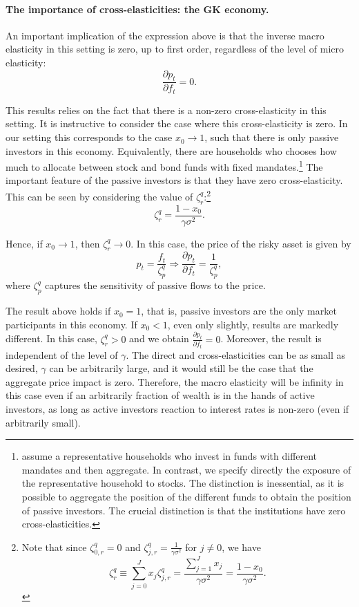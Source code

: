 \documentclass[11pt,english]{article}
\begin{document}
\paragraph{The importance of cross-elasticities: the GK economy.} An important implication of the expression above is that the inverse macro elasticity in this setting is zero, up to first order, regardless of the level of micro elasticity:
\begin{equation}
    \frac{\partial p_t}{\partial f_t} = 0.
\end{equation}

This results relies on the fact that there is a non-zero cross-elasticity in this setting.  
It is instructive to consider the case where this cross-elasticity is zero. 
In our setting this corresponds to the case $x_0 \rightarrow 1$, such that there is only passive investors in this economy. Equivalently, there are households who chooses how much to allocate between stock and bond funds with fixed mandates.\footnote{\citet{gabaix2020search} assume a representative households who invest in funds with different mandates and then aggregate. In contrast, we specify directly the exposure of the representative household to stocks. The distinction is inessential, as it is possible to aggregate the position of the different funds to obtain the position of passive investors. The crucial distinction is that the institutions have zero cross-elasticities. }
The important feature of the passive investors is that they have zero cross-elasticity. 
This can be seen by considering the value of $\zeta_{r}^q$:\footnote{Note that since $\zeta_{0,r}^q=0$ and $\zeta_{j,r}^q=\frac{1}{\gamma\sigma^2}$ for $j\neq0$, we have \[\zeta_{r}^q \equiv \sum_{j=0}^J x_j \zeta_{j,r}^q=\frac{\sum_{j=1}^J x_j}{\gamma\sigma^2}=\frac{1-x_0}{\gamma\sigma^2}.\]}
\begin{equation}
\zeta_r^q = \frac{1-x_0}{\gamma\sigma^2}.
\end{equation}

Hence, if $x_0 \rightarrow 1$, then $\zeta_r^q \rightarrow 0$. In this case, the price of the risky asset is given by
\begin{equation}
    p_t = \frac{f_t}{\zeta_p^q} \Rightarrow \frac{\partial p_t}{\partial f_t} = \frac{1}{\zeta_p^q},
\end{equation}
where $\zeta_{p}^q$ captures the sensitivity of passive flows to the price. 

The result above holds if $x_0 = 1$, that is, passive investors are the only market participants in this economy. If $x_0 < 1$, even only slightly, results are markedly different. In this case, $\zeta_r^q > 0$ and we obtain $\frac{\partial p_t}{\partial f_t} = 0$. Moreover, the result is independent of the level of $\gamma$. 
The direct and cross-elasticities can be as small as desired, $\gamma$ can be arbitrarily large, and it would still be the case that the aggregate price impact is zero. 
Therefore, the macro elasticity will be infinity in this case even if an arbitrarily fraction of wealth is in the hands of active investors, as long as active investors reaction to interest rates is non-zero (even if arbitrarily small). 
\end{document}
